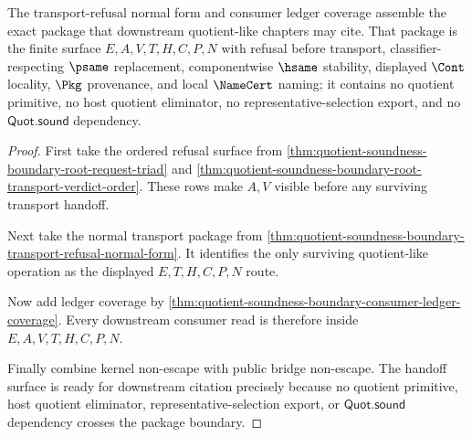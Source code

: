 \begin{theorem}
\label{thm:quotient-soundness-boundary-downstream-handoff-readiness}
The transport-refusal normal form and consumer ledger coverage assemble the
exact package that downstream quotient-like chapters may cite. That package is
the finite surface $E,A,V,T,H,C,P,N$ with refusal before transport,
classifier-respecting $\psame$ replacement, componentwise $\hsame$ stability,
displayed $\Cont$ locality, $\Pkg$ provenance, and local $\NameCert$ naming;
it contains no quotient primitive, no host quotient eliminator, no
representative-selection export, and no $\mathsf{Quot.sound}$ dependency.
\end{theorem}
\begin{proof}
First take the ordered refusal surface from
\autoref{thm:quotient-soundness-boundary-root-request-triad} and
\autoref{thm:quotient-soundness-boundary-root-transport-verdict-order}. These
rows make $A,V$ visible before any surviving transport handoff.

Next take the normal transport package from
\autoref{thm:quotient-soundness-boundary-transport-refusal-normal-form}. It
identifies the only surviving quotient-like operation as the displayed
$E,T,H,C,P,N$ route.

Now add ledger coverage by
\autoref{thm:quotient-soundness-boundary-consumer-ledger-coverage}. Every
downstream consumer read is therefore inside $E,A,V,T,H,C,P,N$.

Finally combine kernel non-escape with public bridge non-escape. The handoff
surface is ready for downstream citation precisely because no quotient
primitive, host quotient eliminator, representative-selection export, or
$\mathsf{Quot.sound}$ dependency crosses the package boundary.
\end{proof}

